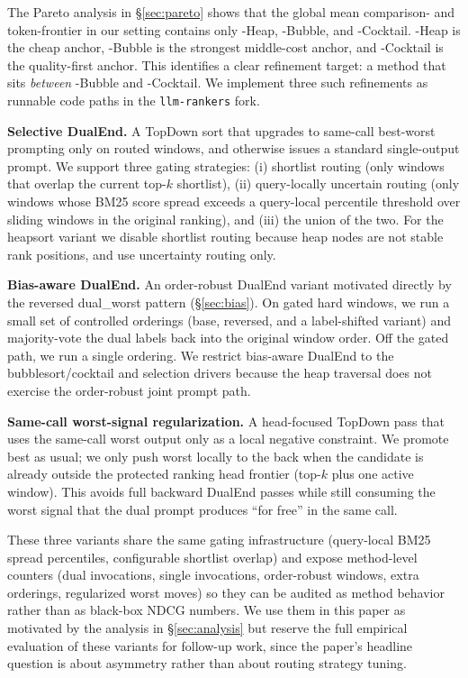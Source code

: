 The Pareto analysis in \S\ref{sec:pareto} shows that the global mean comparison- and token-frontier in our setting contains only \topdown{}-Heap, \topdown{}-Bubble, and \dualend{}-Cocktail. \topdown{}-Heap is the cheap anchor, \topdown{}-Bubble is the strongest middle-cost anchor, and \dualend{}-Cocktail is the quality-first anchor. This identifies a clear refinement target: a method that sits \emph{between} \topdown{}-Bubble and \dualend{}-Cocktail. We implement three such refinements as runnable code paths in the \texttt{llm-rankers} fork.

\textbf{Selective DualEnd.} A TopDown sort that upgrades to same-call best-worst prompting only on routed windows, and otherwise issues a standard single-output prompt. We support three gating strategies: (i) shortlist routing (only windows that overlap the current top-$k$ shortlist), (ii) query-locally uncertain routing (only windows whose BM25 score spread exceeds a query-local percentile threshold over sliding windows in the original ranking), and (iii) the union of the two. For the heapsort variant we disable shortlist routing because heap nodes are not stable rank positions, and use uncertainty routing only.

\textbf{Bias-aware DualEnd.} An order-robust DualEnd variant motivated directly by the reversed dual\_worst pattern (\S\ref{sec:bias}). On gated hard windows, we run a small set of controlled orderings (base, reversed, and a label-shifted variant) and majority-vote the dual labels back into the original window order. Off the gated path, we run a single ordering. We restrict bias-aware DualEnd to the bubblesort/cocktail and selection drivers because the heap traversal does not exercise the order-robust joint prompt path.

\textbf{Same-call worst-signal regularization.} A head-focused TopDown pass that uses the same-call worst output only as a local negative constraint. We promote best as usual; we only push worst locally to the back when the candidate is already outside the protected ranking head frontier (top-$k$ plus one active window). This avoids full backward DualEnd passes while still consuming the worst signal that the dual prompt produces ``for free'' in the same call.

These three variants share the same gating infrastructure (query-local BM25 spread percentiles, configurable shortlist overlap) and expose method-level counters (dual invocations, single invocations, order-robust windows, extra orderings, regularized worst moves) so they can be audited as method behavior rather than as black-box NDCG numbers. We use them in this paper as motivated by the analysis in \S\ref{sec:analysis} but reserve the full empirical evaluation of these variants for follow-up work, since the paper's headline question is about asymmetry rather than about routing strategy tuning.


